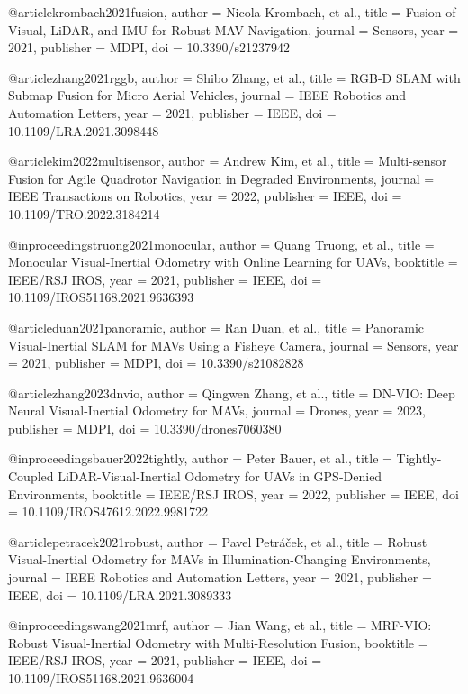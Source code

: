 @article{krombach2021fusion,
  author = {Nicola Krombach, et al.},
  title = {Fusion of Visual, LiDAR, and IMU for Robust MAV Navigation},
  journal = {Sensors},
  year = {2021},
  publisher = {MDPI},
  doi = {10.3390/s21237942}
}

@article{zhang2021rggb,
  author = {Shibo Zhang, et al.},
  title = {RGB-D SLAM with Submap Fusion for Micro Aerial Vehicles},
  journal = {IEEE Robotics and Automation Letters},
  year = {2021},
  publisher = {IEEE},
  doi = {10.1109/LRA.2021.3098448}
}

@article{kim2022multisensor,
  author = {Andrew Kim, et al.},
  title = {Multi-sensor Fusion for Agile Quadrotor Navigation in Degraded Environments},
  journal = {IEEE Transactions on Robotics},
  year = {2022},
  publisher = {IEEE},
  doi = {10.1109/TRO.2022.3184214}
}

@inproceedings{truong2021monocular,
  author = {Quang Truong, et al.},
  title = {Monocular Visual-Inertial Odometry with Online Learning for UAVs},
  booktitle = {IEEE/RSJ IROS},
  year = {2021},
  publisher = {IEEE},
  doi = {10.1109/IROS51168.2021.9636393}
}

@article{duan2021panoramic,
  author = {Ran Duan, et al.},
  title = {Panoramic Visual-Inertial SLAM for MAVs Using a Fisheye Camera},
  journal = {Sensors},
  year = {2021},
  publisher = {MDPI},
  doi = {10.3390/s21082828}
}

@article{zhang2023dnvio,
  author = {Qingwen Zhang, et al.},
  title = {DN-VIO: Deep Neural Visual-Inertial Odometry for MAVs},
  journal = {Drones},
  year = {2023},
  publisher = {MDPI},
  doi = {10.3390/drones7060380}
}

@inproceedings{bauer2022tightly,
  author = {Peter Bauer, et al.},
  title = {Tightly-Coupled LiDAR-Visual-Inertial Odometry for UAVs in GPS-Denied Environments},
  booktitle = {IEEE/RSJ IROS},
  year = {2022},
  publisher = {IEEE},
  doi = {10.1109/IROS47612.2022.9981722}
}

@article{petracek2021robust,
  author = {Pavel Petráček, et al.},
  title = {Robust Visual-Inertial Odometry for MAVs in Illumination-Changing Environments},
  journal = {IEEE Robotics and Automation Letters},
  year = {2021},
  publisher = {IEEE},
  doi = {10.1109/LRA.2021.3089333}
}

@inproceedings{wang2021mrf,
  author = {Jian Wang, et al.},
  title = {MRF-VIO: Robust Visual-Inertial Odometry with Multi-Resolution Fusion},
  booktitle = {IEEE/RSJ IROS},
  year = {2021},
  publisher = {IEEE},
  doi = {10.1109/IROS51168.2021.9636004}
}

